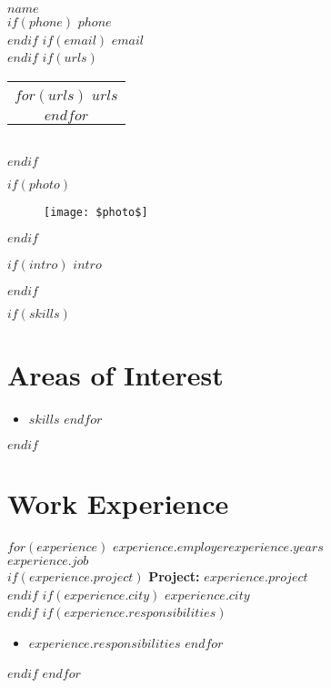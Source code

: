 \documentclass[11pt,a4paper]{article}
\begin{document}
\begin{center}
  {\LARGE\textbf{$name$}}\\[0.2cm]
  $if(phone)$
    $phone$\\[0.1cm]
  $endif$
  $if(email)$
    \href{mailto:$email$}{$email$}\\[0.1cm]
  $endif$
  $if(urls)$
    \begin{tabular}{c}
    $for(urls)$
      \href{https://$urls$}{$urls$}\\
    $endfor$
    \end{tabular}\\[0.2cm]
  $endif$
\end{center}

$if(photo)$
\begin{figure}[H]
  \centering
  \texttt{[image: \$photo\$]}
\end{figure}
$endif$

\vspace{0.5cm}

$if(intro)$
\noindent $intro$

\vspace{0.5cm}
$endif$

$if(skills)$
\section*{Areas of Interest}
\begin{itemize}
$for(skills)$
  \item $skills$
$endfor$
\end{itemize}
$endif$

\section*{Work Experience}
$for(experience)$
\noindent\textbf{$experience.employer$}\hfill$experience.years$\\
\emph{$experience.job$}\\
$if(experience.project)$
  \textbf{Project:} $experience.project$\\
$endif$
$if(experience.city)$
  $experience.city$\\
$endif$
$if(experience.responsibilities)$
\begin{itemize}
$for(experience.responsibilities)$
  \item $experience.responsibilities$
$endfor$
\end{itemize}
$endif$
\vspace{0.3cm}
$endfor$
\end{document}

